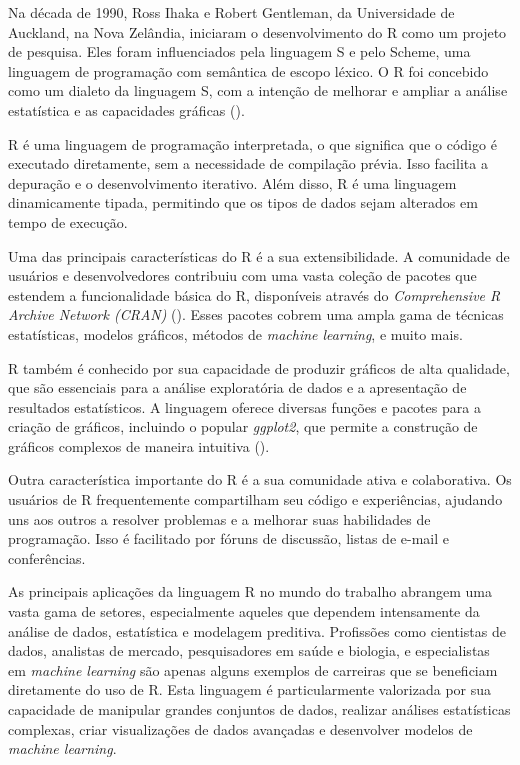 \documentclass[
]{book}
\begin{document}
Na década de 1990, Ross Ihaka e Robert Gentleman, da Universidade de Auckland, na Nova Zelândia, iniciaram o desenvolvimento do R como um projeto de pesquisa. Eles foram influenciados pela linguagem S e pelo Scheme, uma linguagem de programação com semântica de escopo léxico. O R foi concebido como um dialeto da linguagem S, com a intenção de melhorar e ampliar a análise estatística e as capacidades gráficas ().

R é uma linguagem de programação interpretada, o que significa que o código é executado diretamente, sem a necessidade de compilação prévia. Isso facilita a depuração e o desenvolvimento iterativo. Além disso, R é uma linguagem dinamicamente tipada, permitindo que os tipos de dados sejam alterados em tempo de execução.

Uma das principais características do R é a sua extensibilidade. A comunidade de usuários e desenvolvedores contribuiu com uma vasta coleção de pacotes que estendem a funcionalidade básica do R, disponíveis através do \emph{Comprehensive R Archive Network (CRAN)} (). Esses pacotes cobrem uma ampla gama de técnicas estatísticas, modelos gráficos, métodos de \emph{machine learning}, e muito mais.

R também é conhecido por sua capacidade de produzir gráficos de alta qualidade, que são essenciais para a análise exploratória de dados e a apresentação de resultados estatísticos. A linguagem oferece diversas funções e pacotes para a criação de gráficos, incluindo o popular \emph{ggplot2}, que permite a construção de gráficos complexos de maneira intuitiva ().

Outra característica importante do R é a sua comunidade ativa e colaborativa. Os usuários de R frequentemente compartilham seu código e experiências, ajudando uns aos outros a resolver problemas e a melhorar suas habilidades de programação. Isso é facilitado por fóruns de discussão, listas de e-mail e conferências.

As principais aplicações da linguagem R no mundo do trabalho abrangem uma vasta gama de setores, especialmente aqueles que dependem intensamente da análise de dados, estatística e modelagem preditiva. Profissões como cientistas de dados, analistas de mercado, pesquisadores em saúde e biologia, e especialistas em \emph{machine learning} são apenas alguns exemplos de carreiras que se beneficiam diretamente do uso de R. Esta linguagem é particularmente valorizada por sua capacidade de manipular grandes conjuntos de dados, realizar análises estatísticas complexas, criar visualizações de dados avançadas e desenvolver modelos de \emph{machine learning}.
\end{document}
